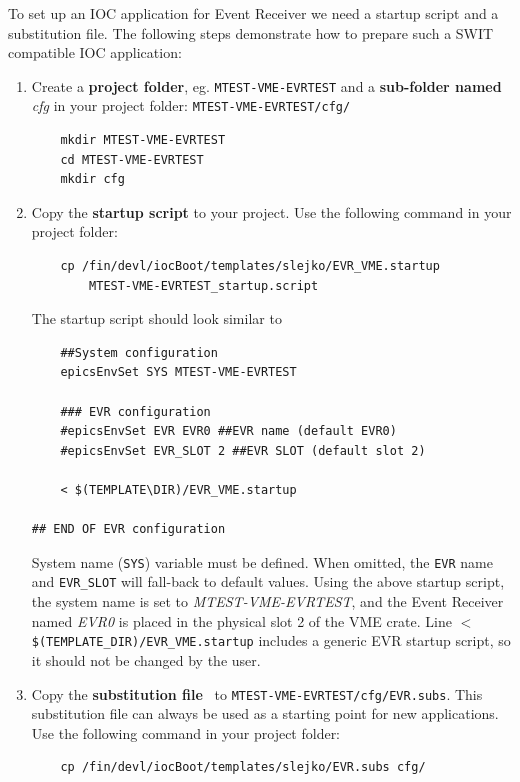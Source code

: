 \documentclass[12pt,a4paper]{article}
\begin{document}
To set up an IOC application for Event Receiver we need a startup script and a substitution file. The following steps demonstrate how to prepare such a SWIT compatible IOC application:
\begin{enumerate}

	\item Create a \textbf{project folder}, eg. \texttt{MTEST-VME-EVRTEST} and a \textbf{sub-folder named} \textit{cfg} in your project folder: \texttt{MTEST-VME-EVRTEST/cfg/}
\begin{verbatim}
	mkdir MTEST-VME-EVRTEST
	cd MTEST-VME-EVRTEST
	mkdir cfg
\end{verbatim}

	\item Copy the \textbf{startup script} to your project. Use the following command in your project folder:
\begin{verbatim}
	cp /fin/devl/iocBoot/templates/slejko/EVR_VME.startup 
	    MTEST-VME-EVRTEST_startup.script
\end{verbatim}

	The startup script should look similar to 
\begin{verbatim}
	##System configuration
	epicsEnvSet SYS MTEST-VME-EVRTEST
	
	### EVR configuration
	#epicsEnvSet EVR EVR0 ##EVR name (default EVR0)
	#epicsEnvSet EVR_SLOT 2 ##EVR SLOT (default slot 2)
	
	< $(TEMPLATE\DIR)/EVR_VME.startup
	
## END OF EVR configuration
\end{verbatim}

System name (\texttt{SYS}) variable must be defined. When omitted, the \texttt{EVR} name and \texttt{EVR\_SLOT} will fall-back to default values. Using the above startup script, the system name is set to \textit{MTEST-VME-EVRTEST}, and the Event Receiver named \textit{EVR0} is placed in the physical slot 2 of the VME crate. Line \texttt{$<$ \$(TEMPLATE\_DIR)/EVR\_VME.startup} includes a generic EVR startup script, so it should not be changed by the user.

	\item Copy the \textbf{substitution file}~\cite{substitution_git} to \texttt{MTEST-VME-EVRTEST/cfg/EVR.subs}. This substitution file can always be used as a starting point for new applications. Use the following command in your project folder: 
\begin{verbatim}
	cp /fin/devl/iocBoot/templates/slejko/EVR.subs cfg/
\end{verbatim}
\end{enumerate}
\end{document}
